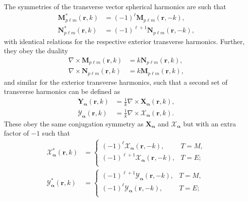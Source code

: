 The symmetries of the transverse vector spherical harmonics are such that
\begin{equation}
\begin{split}
\mathbf{M}_{p\ell m}^*(\mathbf{r},k) &= (-1)^\ell\mathbf{M}_{p\ell m}(\mathbf{r},-k),\\
\mathbf{N}_{p\ell m}^*(\mathbf{r},k) &= (-1)^{\ell + 1}\mathbf{N}_{p\ell m}(\mathbf{r},-k),
\end{split}
\end{equation}
with identical relations for the respective exterior transverse harmonics. Further, they obey the duality
\begin{equation}
\begin{split}
\nabla\times\mathbf{M}_{p\ell m}(\mathbf{r},k) &= k\mathbf{N}_{p\ell m}(\mathbf{r},k),\\
\nabla\times\mathbf{N}_{p\ell m}(\mathbf{r},k) &= k\mathbf{M}_{p\ell m}(\mathbf{r},k),
\end{split}
\end{equation}
and similar for the exterior transverse harmonics, such that a second set of transverse harmonics can be defined as 
\begin{equation}
\begin{split}
\mathbf{Y}_{\bm{\alpha}}(\mathbf{r},k) &= \frac{1}{k}\nabla\times\mathbf{X}_{\bm{\alpha}}(\mathbf{r},k),\\
\bm{\mathcal{Y}}_{\bm{\alpha}}(\mathbf{r},k) &= \frac{1}{k}\nabla\times\bm{\mathcal{X}}_{\bm{\alpha}}(\mathbf{r},k).
\end{split}
\end{equation}
These obey the same conjugation symmetry as $\mathbf{X}_{\bm{\alpha}}$ and $\bm{\mathcal{X}}_{\bm{\alpha}}$ but with an extra factor of $-1$ such that
\begin{equation}
\begin{split}
\bm{\mathcal{X}}_{\bm{\alpha}}^*(\mathbf{r},k) &= 
\begin{cases}
(-1)^{\ell}\bm{\mathcal{X}}_{\bm{\alpha}}(\mathbf{r},-k), & T = M,\\
(-1)^{\ell + 1}\bm{\mathcal{X}}_{\bm{\alpha}}(\mathbf{r},-k), & T = E;\\
\end{cases}\\
\bm{\mathcal{Y}}_{\bm{\alpha}}^*(\mathbf{r},k) &= 
\begin{cases}
(-1)^{\ell + 1}\bm{\mathcal{Y}}_{\bm{\alpha}}(\mathbf{r},-k), & T = M,\\
(-1)^{\ell}\bm{\mathcal{Y}}_{\bm{\alpha}}(\mathbf{r},-k), & T = E;\\
\end{cases}
\end{split}
\end{equation}
